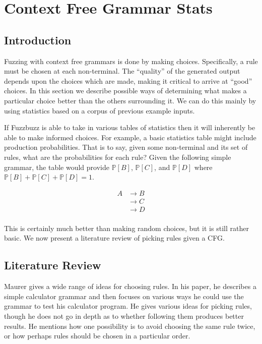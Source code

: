 \section{Context Free Grammar Stats}
\label{cfgstats}
\subsection{Introduction}
Fuzzing with context free grammars is done by making choices. Specifically, a
rule must be chosen at each non-terminal. The ``quality'' of the generated
output depends upon the choices which are made, making it critical to arrive at
``good'' choices. In this section we describe possible ways of determining what
makes a particular choice better than the others surrounding it. We can do
this mainly by using statistics based on a corpus of previous example inputs.

If Fuzzbuzz is able to take in various tables of statistics then it will
inherently be able to make informed choices. For example, a basic statistics
table might include production probabilities. That is to say, given some
non-terminal and its set of rules, what are the probabilities for each rule?
Given the following simple grammar, the table would provide $\mathbb{P}[B]$,
$\mathbb{P}[C]$, and $\mathbb{P}[D]$ where $\mathbb{P}[B] + \mathbb{P}[C] +
\mathbb{P}[D] = 1$.

\begin{align*}
A &\rightarrow B \\
&\rightarrow C \\
&\rightarrow D \\
\end{align*}

\noindent
This is certainly much better than making random choices, but it is still
rather basic. We now present a literature review of picking rules given a CFG.

\subsection{Literature Review}

Maurer\cite{Maurer1990} gives a wide range of ideas for choosing rules. In his
paper, he describes a simple calculator grammar and then focuses on various
ways he could use the grammar to test his calculator program. He gives various
ideas for picking rules, though he does not go in depth as to whether following
them produces better results. He mentions how one possibility is to avoid
choosing the same rule twice, or how perhaps rules should be chosen in a
particular order.

